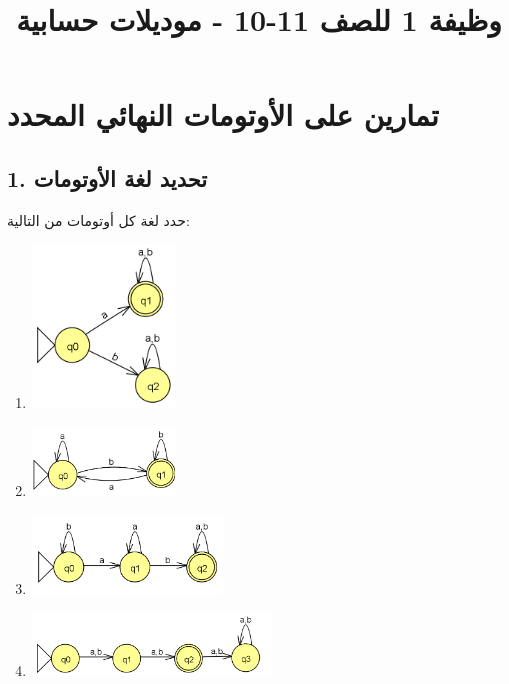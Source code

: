 \documentclass[12pt]{article}
\title{وظيفة 1 للصف 11-10 - موديلات حسابية}
\begin{document}
\maketitle

\section*{تمارين على الأوتومات النهائي المحدد}

\subsection*{1. تحديد لغة الأوتومات}

حدد لغة كل أوتومات من التالية:

\begin{enumerate}

\item
\includegraphics[width=0.3\textwidth]{../../../images/DFAs/ex1_q1.png}\\

\item
\includegraphics[width=0.3\textwidth]{../../../images/DFAs/ex1_q2.png}\\

\item
\includegraphics[width=0.4\textwidth]{../../../images/DFAs/ex1_q3.png}\\

\item
\includegraphics[width=0.5\textwidth]{../../../images/DFAs/ex1_q4.png}\\


\end{enumerate}
\end{document}
